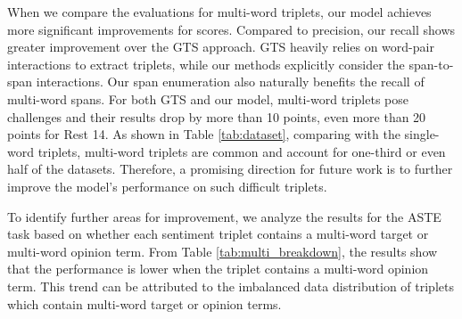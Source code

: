 \documentclass[11pt,a4paper]{article}
\begin{document}
When we compare the evaluations for multi-word triplets,
our model achieves more significant improvements for  scores. Compared to precision, our recall shows greater improvement over the GTS approach.
GTS heavily relies on word-pair interactions to extract triplets,
while our methods explicitly consider the span-to-span interactions. 
Our span enumeration also 
naturally benefits the recall of multi-word spans. 
For both GTS and our model, multi-word triplets pose  challenges and their  results drop by more than 10 points, even more than 20 points for Rest 14. 
As shown in Table \ref{tab:dataset}, comparing with the single-word triplets, multi-word triplets are common and account for one-third or even half of the datasets. 
Therefore, a promising direction for future work is to further improve the model's performance on such difficult triplets. 

To identify further areas for improvement,
we analyze the results for the ASTE task based on whether each sentiment triplet contains a multi-word target or multi-word opinion term.
From Table \ref{tab:multi_breakdown}, the results show that the performance is lower when the triplet contains a multi-word opinion term.
This trend can be attributed to the imbalanced data distribution of triplets which contain multi-word target or opinion terms.
\end{document}
